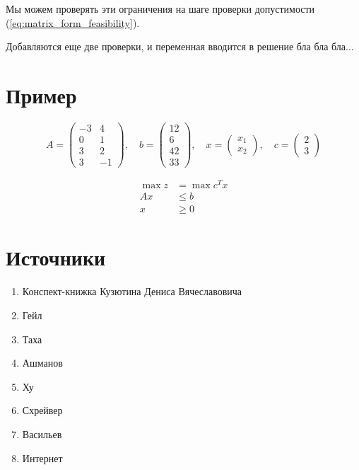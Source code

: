 \documentclass[a4paper,article,14pt]{extarticle}
\begin{document}
Мы можем проверять эти ограничения на шаге проверки допустимости (\ref{eq:matrix_form_feasibility}).

Добавляются еще две проверки, и переменная вводится в решение бла бла бла...

\newpage

\section{Пример}

\begin{equation}
    A = \begin{pmatrix}
        -3 & 4 \\
        0 & 1 \\
        3 & 2 \\
        3 & -1
    \end{pmatrix}
    , \quad
    b =
    \begin{pmatrix}
        12 \\
        6 \\
        42 \\
        33
    \end{pmatrix}
    , \quad 
    x = \begin{pmatrix}
        x_1 \\ x_2
    \end{pmatrix}
    , \quad
    c = \begin{pmatrix}
        2 \\ 3
    \end{pmatrix}
\end{equation}

\begin{equation}
    \begin{aligned}
        \max z & = \max c^Tx \\
        Ax & \le b \\
        x & \ge 0
    \end{aligned}
\end{equation}

\newpage

\section{Источники}

\begin{enumerate}
    \item Конспект-книжка Кузютина Дениса Вячеславовича
    \item Гейл
    \item Таха
    \item Ашманов
    \item Ху
    \item Схрейвер
    \item Васильев
    \item Интернет
\end{enumerate}
\end{document}
